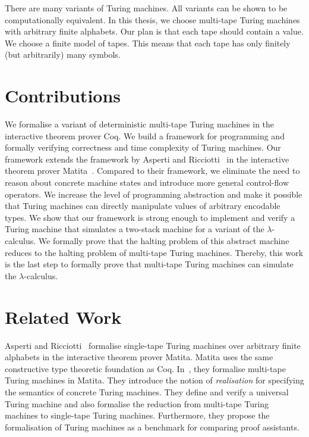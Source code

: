There are many variants of Turing machines.  All variants can be shown to be computationally equivalent.  In this thesis, we choose multi-tape Turing
machines with arbitrary finite alphabets.  Our plan is that each tape should contain a value.  We choose a finite model of tapes.  This means that
each tape has only finitely (but arbitrarily) many symbols.


\section{Contributions}
\label{sec:contributions}

We formalise a variant of deterministic multi-tape Turing machines in the interactive theorem prover Coq.  We build a framework for programming and
formally verifying correctness and time complexity of Turing machines.  Our framework extends the framework by Asperti and
Ricciotti~\cite{asperti2015} in the interactive theorem prover Matita~\cite{asperti2011matita}.  Compared to their framework, we eliminate the need to
reason about concrete machine states and introduce more general control-flow operators.  We increase the level of programming abstraction and make it
possible that Turing machines can directly manipulate values of arbitrary encodable types.  We show that our framework is strong enough to implement
and verify a Turing machine that simulates a two-stack machine for a variant of the $\lambda$-calculus.  We formally prove that the halting problem of
this abstract machine reduces to the halting problem of multi-tape Turing machines.  Thereby, this work is the last step to formally prove that
multi-tape Turing machines can simulate the $\lambda$-calculus.

\section{Related Work}
\label{sec:relatedwork}

Asperti and Ricciotti~\cite{asperti2012} formalise single-tape Turing machines over arbitrary finite alphabets in the interactive theorem prover
Matita.  Matita uses the same constructive type theoretic foundation as Coq.  In~\cite{asperti2015}, they formalise multi-tape Turing machines in
Matita.  They introduce the notion of \textit{realisation} for specifying the semantics of concrete Turing machines.  They define and verify a
universal Turing machine and also formalise the reduction from multi-tape Turing machines to single-tape Turing machines.  Furthermore, they propose
the formalisation of Turing machines as a benchmark for comparing proof assistants.

